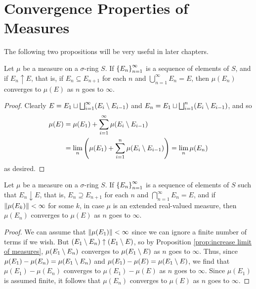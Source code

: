 \section{Convergence Properties of Measures}

The following two propositions will be very useful in later chapters.

\begin{proposition}\label{prop:increase limit of measures}
Let $\mu$ be a measure on a $\sigma$-ring $S$. If $\left\{E_n\right\}_{n=1}^\infty$ is a sequence of elements of $S$, and if $E_n\uparrow E$, that is, if $E_n\subseteq E_{n+1}$ for each $n$ and $\bigcup_{n=1}^\infty E_n=E$, then $\mu(E_n)$ converges to $\mu(E)$ as $n$ goes to $\infty$. 
\end{proposition}

\begin{proof}
Clearly $E=E_1\sqcup\bigsqcup_{i=1}^\infty(E_i\setminus E_{i-1})$ and $E_n=E_1\sqcup\bigsqcup_{i=1}^n(E_i\setminus E_{i-1})$, and so
\begin{align*}
\mu(E)&=\mu(E_1)+\sum_{i=1}^\infty\mu(E_i\setminus E_{i-1})\\
&=\lim_n\left(\mu(E_1)+\sum_{i=1}^n\mu(E_i\setminus E_{i-1})\right)=\lim_n\mu(E_n)
\end{align*}
as desired.
\end{proof}

\begin{proposition}\label{prop:decrease limit of measures}
Let $\mu$ be a measure on a $\sigma$-ring $S$. If $\left\{E_n\right\}_{n=1}^\infty$ is a sequence of elements of $S$ such that $E_n\downarrow E$, that is, $E_n\supseteq E_{n+1}$ for each $n$ and $\bigcap_{n=1}^\infty E_n=E$, and if $\norm{\mu(E_k)}<\infty$ for some $k$, in case $\mu$ is an extended real-valued measure, then $\mu(E_n)$ converges to $\mu(E)$ as $n$ goes to $\infty$.
\end{proposition}

\begin{proof}
We can assume that $\norm{\mu(E_1)}<\infty$ since we can ignore a finite number of terms if we wish. But $(E_1\setminus E_n)\uparrow(E_1\setminus E)$, so by Proposition \ref{prop:increase limit of measures}, $\mu(E_1\setminus E_n)$ converges to $\mu(E_1\setminus E)$ as $n$ goes to $\infty$. Thus, since $\mu(E_1)-\mu(E_n)=\mu(E_1\setminus E_n)$ and $\mu(E_1)-\mu(E)=\mu(E_1\setminus E)$, we find that $\mu(E_1)-\mu(E_n)$ converges to $\mu(E_1)-\mu(E)$ as $n$ goes to $\infty$. Since $\mu(E_1)$ is assumed finite, it follows that $\mu(E_n)$ converges to $\mu(E)$ as $n$ goes to $\infty$.
\end{proof}

